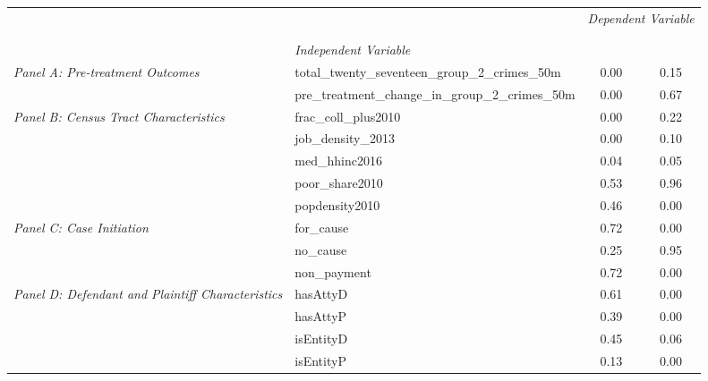 \begin{tabular}{llcc}
\toprule
 &  & \multicolumn{2}{c}{\textit{Dependent Variable}} \\
\cline{3-4}
\\
 &  &  &  \\
 & \emph{Independent Variable} &  &  \\
\midrule
\multirow[c]{2}{3cm}{\textit{Panel A: Pre-treatment Outcomes}} & total_twenty_seventeen_group_2_crimes_50m & 0.00 & 0.15 \\
 & pre_treatment_change_in_group_2_crimes_50m & 0.00 & 0.67 \\
\cline{1-4}
\multirow[c]{5}{3cm}{\textit{Panel B: Census Tract Characteristics}} & frac_coll_plus2010 & 0.00 & 0.22 \\
 & job_density_2013 & 0.00 & 0.10 \\
 & med_hhinc2016 & 0.04 & 0.05 \\
 & poor_share2010 & 0.53 & 0.96 \\
 & popdensity2010 & 0.46 & 0.00 \\
\cline{1-4}
\multirow[c]{3}{3cm}{\textit{Panel C: Case Initiation}} & for_cause & 0.72 & 0.00 \\
 & no_cause & 0.25 & 0.95 \\
 & non_payment & 0.72 & 0.00 \\
\cline{1-4}
\multirow[c]{4}{3cm}{\textit{Panel D: Defendant and Plaintiff Characteristics}} & hasAttyD & 0.61 & 0.00 \\
 & hasAttyP & 0.39 & 0.00 \\
 & isEntityD & 0.45 & 0.06 \\
 & isEntityP & 0.13 & 0.00 \\
\cline{1-4}
\bottomrule
\end{tabular}
